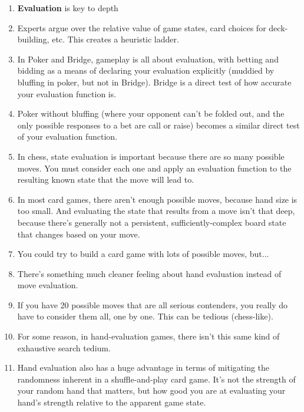 \documentclass[12pt]{article}
\begin{document}
\begin{enumerate}


\item {\bf Evaluation} is key to depth

\item Experts argue over the relative value of game states, card choices for deck-building, etc.  This creates a heuristic ladder.

\item In Poker and Bridge, gameplay is all about evaluation, with betting and bidding as a means of declaring your evaluation explicitly (muddied by bluffing in poker, but not in Bridge).  Bridge is a direct test of how accurate your evaluation function is.

\item Poker without bluffing (where your opponent can't be folded out, and the only possible responses to a bet are call or raise) becomes a similar direct test of your evaluation function.

\item In chess, state evaluation is important because there are so many possible moves.  You must consider each one and apply an evaluation function to the resulting known state that the move will lead to.

\item In most card games, there aren't enough possible moves, because hand size is too small.  And evaluating the state that results from a move isn't that deep, because there's generally not a persistent, sufficiently-complex board state that changes based on your move.

\item You could try to build a card game with lots of possible moves, but...

\item There's something much cleaner feeling about hand evaluation instead of move evaluation.

\item If you have 20 possible moves that are all serious contenders, you really do have to consider them all, one by one.  This can be tedious (chess-like).

\item For some reason, in hand-evaluation games, there isn't this same kind of exhaustive search tedium.

\item Hand evaluation also has a huge advantage in terms of mitigating the randomness inherent in a shuffle-and-play card game.  It's not the strength of your random hand that matters, but how good you are at evaluating your hand's strength relative to the apparent game state.

\end{enumerate}
\end{document}
